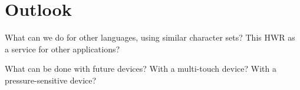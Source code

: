 
\chapter{Outlook}

What can we do for other languages, using similar character sets?
This HWR as a service for other applications?

What can be done with future devices?
With a multi-touch device?
With a pressure-sensitive device?

